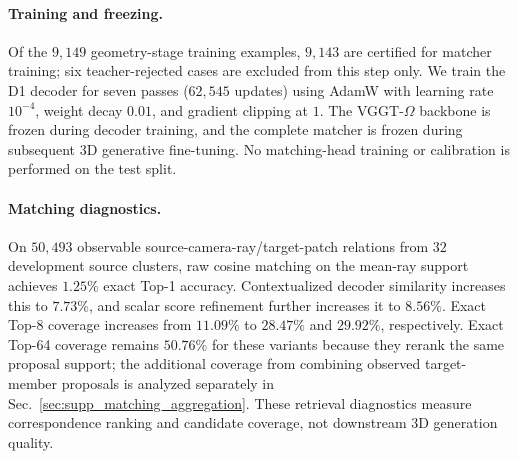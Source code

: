 \begin{appendix}
\paragraph{Training and freezing.}
Of the $9{,}149$ geometry-stage training examples, $9{,}143$ are certified for matcher training; six teacher-rejected cases are excluded from this step only.
We train the D1 decoder for seven passes ($62{,}545$ updates) using AdamW with learning rate $10^{-4}$, weight decay $0.01$, and gradient clipping at $1$.
The VGGT-$\Omega$ backbone is frozen during decoder training, and the complete matcher is frozen during subsequent 3D generative fine-tuning.
No matching-head training or calibration is performed on the test split.

\paragraph{Matching diagnostics.}
On $50{,}493$ observable source-camera-ray/target-patch relations from $32$ development source clusters, raw cosine matching on the mean-ray support achieves $1.25\%$ exact Top-1 accuracy.
Contextualized decoder similarity increases this to $7.73\%$, and scalar score refinement further increases it to $8.56\%$.
Exact Top-8 coverage increases from $11.09\%$ to $28.47\%$ and $29.92\%$, respectively.
Exact Top-64 coverage remains $50.76\%$ for these variants because they rerank the same proposal support; the additional coverage from combining observed target-member proposals is analyzed separately in Sec.~\ref{sec:supp_matching_aggregation}.
These retrieval diagnostics measure correspondence ranking and candidate coverage, not downstream 3D generation quality.











































\end{appendix}
